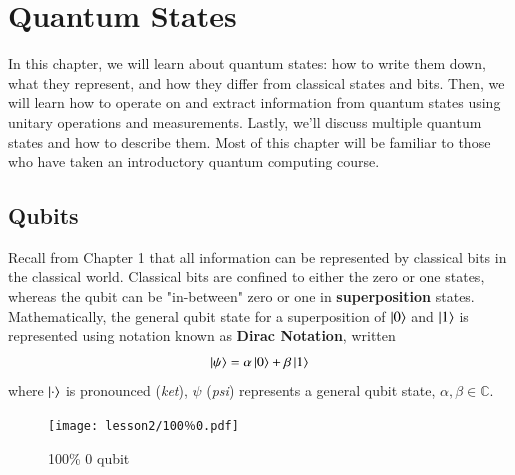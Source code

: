 \chapter[Quantum States]{Quantum States}
\label{sec:2_quantum_states}





In this chapter, we will learn about quantum states: how to write them down, what they represent, and how they differ from classical states and bits.
Then, we will learn how to operate on and extract information from quantum states using unitary operations and measurements. Lastly, we'll discuss multiple quantum states and how to describe them.  Most of this chapter will be familiar to those who have taken an introductory quantum computing course.


\section{Qubits}



Recall from Chapter 1 that all information can be represented by classical bits in the classical world. Classical bits are confined to either the zero or one states, whereas the qubit can be "in-between" zero or one in  \textbf{superposition} states. Mathematically, the general qubit state for a superposition of $\left| 0 \right\rangle$ and $\left| 1 \right\rangle$ is represented using notation known as \textbf{Dirac Notation}, written
\begin{equation}
\left| \psi \right\rangle = \alpha \left| 0 \right\rangle + \beta\left| 1 \right\rangle 
\end{equation}
 where $\left| \cdot \right\rangle$ is pronounced (\emph{ket}), $\psi$ (\emph{psi}) represents a general qubit state, $\alpha,\beta \in \mathbb{C}$.\label{def:ket}

\begin{figure}[H]
    \centering
    \texttt{[image: lesson2/100％0.pdf]}
        \caption{100\% 0 qubit}
    \label{fig:100-zero}
\end{figure}

